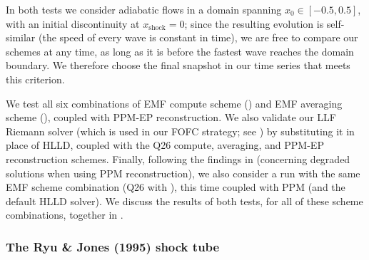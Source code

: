 In both tests we consider adiabatic flows in a domain spanning $x_0 \in [-0.5, 0.5]$, with an initial discontinuity at $x_\mathrm{shock} = 0$; since the resulting evolution is self-similar (the speed of every wave is constant in time), we are free to compare our schemes at any time, as long as it is before the fastest wave reaches the domain boundary. We therefore choose the final snapshot in our time series that meets this criterion.

We test all six combinations of EMF compute scheme () and EMF averaging scheme (), coupled with PPM-EP reconstruction. We also validate our LLF Riemann solver (which is used in our FOFC strategy; see ) by substituting it in place of HLLD, coupled with the Q26 compute,  averaging, and PPM-EP reconstruction schemes. Finally, following the findings in  (concerning degraded solutions when using PPM reconstruction), we also consider a run with the same EMF scheme combination (Q26 with ), this time coupled with PPM (and the default HLLD solver). We discuss the results of both tests, for all of these scheme combinations, together in .

\subsubsection{The Ryu \& Jones (1995) shock tube}
\label{sec:scheme-comparison:shocks:ryu-jones}


